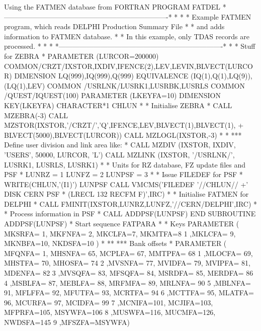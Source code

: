 \begin{XMPt}{Using the FATMEN database from FORTRAN}
      PROGRAM FATDEL
*----------------------------------------------------------------------*
*                                                                      *
* Example FATMEN program, which reads DELPHI Production Summary File   *
* and adds information to FATMEN database.                             *
* In this example, only TDAS records are processed.                    *
*                                                                      *
*----------------------------------------------------------------------*
*
*     Stuff for ZEBRA
*
      PARAMETER (LURCOR=200000)
      COMMON/CRZT/IXSTOR,IXDIV,IFENCE(2),LEV,LEVIN,BLVECT(LURCOR)
      DIMENSION    LQ(999),IQ(999),Q(999)
      EQUIVALENCE (IQ(1),Q(1),LQ(9)),(LQ(1),LEV)
      COMMON /USRLNK/LUSRK1,LUSRBK,LUSRLS
      COMMON /QUEST/IQUEST(100)
      PARAMETER       (LKEYFA=10)
      DIMENSION KEY(LKEYFA)
      CHARACTER*1 CHLUN
*
*     Initialise ZEBRA
*
      CALL MZEBRA(-3)
      CALL MZSTOR(IXSTOR,'/CRZT/','Q',IFENCE,LEV,BLVECT(1),BLVECT(1),
     +            BLVECT(5000),BLVECT(LURCOR))
      CALL MZLOGL(IXSTOR,-3)
*
* *** Define user division and link area like:
*
      CALL MZDIV  (IXSTOR, IXDIV, 'USERS', 50000, LURCOR, 'L')
      CALL MZLINK (IXSTOR, '/USRLNK/', LUSRK1, LUSRLS, LUSRK1)
*
*     Units for RZ database, FZ update files and PSF
*
      LUNRZ  = 1
      LUNFZ  = 2
      LUNPSF = 3
*
*     Issue FILEDEF for PSF
*
      WRITE(CHLUN,'(I1)') LUNPSF
      CALL VMCMS('FILEDEF '//CHLUN//
     +' DISK CERN PSF * (LRECL 132 RECFM F)',IRC)
*
*     Initialise FATMEN for DELPHI
*
      CALL FMINIT(IXSTOR,LUNRZ,LUNFZ,'//CERN/DELPHI',IRC)
*
*     Process information in PSF
*
      CALL ADDPSF(LUNPSF)
      END
      SUBROUTINE ADDPSF(LUNPSF)
* Start sequence FATPARA
*
*          Keys
      PARAMETER ( MKSRFA= 1, MKFNFA= 2, MKCLFA=7, MKMTFA=8
     1           ,MKLCFA= 9, MKNBFA=10, NKDSFA=10 )
*
** ***     Bank offsets
*
      PARAMETER ( MFQNFA=  1, MHSNFA= 65, MCPLFA= 67, MMTPFA= 68
     1           ,MLOCFA= 69, MHSTFA= 70, MHOSFA= 74
     2           ,MVSNFA= 77, MVIDFA= 79, MVIPFA= 81, MDENFA= 82
     3           ,MVSQFA= 83, MFSQFA= 84, MSRDFA= 85, MERDFA= 86
     4           ,MSBLFA= 87, MEBLFA= 88, MRFMFA= 89, MRLNFA= 90
     5           ,MBLNFA= 91, MFLFFA= 92, MFUTFA= 93, MCRTFA= 94
     6           ,MCTTFA= 95, MLATFA= 96, MCURFA= 97, MCIDFA= 99
     7           ,MCNIFA=101, MCJIFA=103, MFPRFA=105, MSYWFA=106
     8           ,MUSWFA=116, MUCMFA=126, NWDSFA=145
     9           ,MFSZFA=MSYWFA)
 

\end{XMPt}
